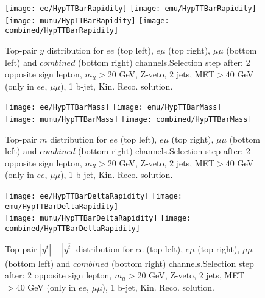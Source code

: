 \clearpage
\newpage

\begin{figure}
  \texttt{[image: ee/HypTTBarRapidity]}
  \texttt{[image: emu/HypTTBarRapidity]}\\
  \texttt{[image: mumu/HypTTBarRapidity]}
  \texttt{[image: combined/HypTTBarRapidity]}
\caption{Top-pair $y$ distribution for $ee$ (top left), $e\mu$ (top right), $\mu\mu$ (bottom left) and $combined$ (bottom right) channels.\newline Selection step after: 2 opposite sign lepton, $m_{ll}>20$ GeV, Z-veto, 2 jets, MET$>40$ GeV (only in $ee$, $\mu\mu$), 1 b-jet, Kin. Reco. solution.}
\end{figure}

\clearpage
\newpage


\begin{figure}
  \texttt{[image: ee/HypTTBarMass]}
  \texttt{[image: emu/HypTTBarMass]}\\
  \texttt{[image: mumu/HypTTBarMass]}
  \texttt{[image: combined/HypTTBarMass]}
\caption{Top-pair $m$ distribution for $ee$ (top left), $e\mu$ (top right), $\mu\mu$ (bottom left) and $combined$ (bottom right) channels.\newline Selection step after: 2 opposite sign lepton, $m_{ll}>20$ GeV, Z-veto, 2 jets, MET$>40$ GeV (only in $ee$, $\mu\mu$), 1 b-jet, Kin. Reco. solution.}
\end{figure}

\clearpage
\newpage

\begin{figure}
  \texttt{[image: ee/HypTTBarDeltaRapidity]}
  \texttt{[image: emu/HypTTBarDeltaRapidity]}\\
  \texttt{[image: mumu/HypTTBarDeltaRapidity]}
  \texttt{[image: combined/HypTTBarDeltaRapidity]}
\caption{Top-pair $|y^t| - |y^{\bar{t}}|$ distribution for $ee$ (top left), $e\mu$ (top right), $\mu\mu$ (bottom left) and $combined$ (bottom right) channels.\newline Selection step after: 2 opposite sign lepton, $m_{ll}>20$ GeV, Z-veto, 2 jets, MET$>40$ GeV (only in $ee$, $\mu\mu$), 1 b-jet, Kin. Reco. solution.}
\end{figure}

